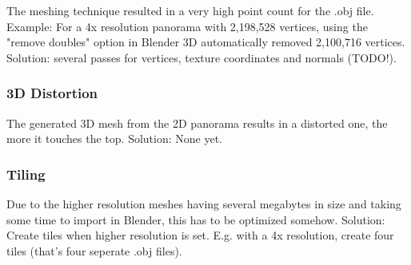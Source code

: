 The meshing technique resulted in a very high point count for the .obj file. Example: For a 4x resolution panorama with 2,198,528 vertices, using the "remove doubles" option in Blender 3D automatically removed 2,100,716 vertices.
Solution: several passes for vertices, texture coordinates and normals (TODO!).

\subsubsection{3D Distortion}

The generated 3D mesh from the 2D panorama results in a distorted one, the more it touches the top.
Solution: None yet.

\subsubsection{Tiling}

Due to the higher resolution meshes having several megabytes in size and taking some time to import in Blender, this has to be optimized somehow.
Solution: Create tiles when higher resolution is set. E.g. with a 4x resolution, create four tiles (that's four seperate .obj files).